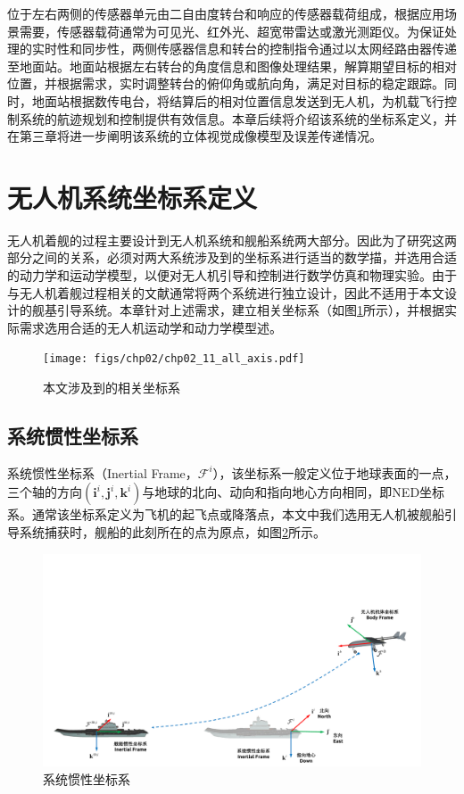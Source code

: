 位于左右两侧的传感器单元由二自由度转台和响应的传感器载荷组成，根据应用场景需要，传感器载荷通常为可见光、红外光、超宽带雷达或激光测距仪。为保证处理的实时性和同步性，两侧传感器信息和转台的控制指令通过以太网经路由器传递至地面站。地面站根据左右转台的角度信息和图像处理结果，解算期望目标的相对位置，并根据需求，实时调整转台的俯仰角或航向角，满足对目标的稳定跟踪。同时，地面站根据数传电台，将结算后的相对位置信息发送到无人机，为机载飞行控制系统的航迹规划和控制提供有效信息。本章后续将介绍该系统的坐标系定义，并在第三章将进一步阐明该系统的立体视觉成像模型及误差传递情况。


\section{无人机系统坐标系定义}
无人机着舰的过程主要设计到无人机系统和舰船系统两大部分。因此为了研究这两部分之间的关系，必须对两大系统涉及到的坐标系进行适当的数学描，并选用合适的动力学和运动学模型，以便对无人机引导和控制进行数学仿真和物理实验。由于与无人机着舰过程相关的文献通常将两个系统进行独立设计，因此不适用于本文设计的舰基引导系统。本章针对上述需求，建立相关坐标系（如图\ref{fig:chp02_11_all_axis}所示），并根据实际需求选用合适的无人机运动学和动力学模型述\cite{beardsmall}。
\begin{figure}[!t]   
	\centering
	\texttt{[image: figs/chp02/chp02\_11\_all\_axis.pdf]}
	\caption{本文涉及到的相关坐标系}
	\label{fig:chp02_11_all_axis}
\end{figure}



\subsection{系统惯性坐标系}
系统惯性坐标系（Inertial Frame，$\mathcal{F}^i$），该坐标系一般定义位于地球表面的一点，三个轴的方向$(\mathbf{i}^i, \mathbf{j}^i,\mathbf{k}^i)$与地球的北向、动向和指向地心方向相同，即NED坐标系。通常该坐标系定义为飞机的起飞点或降落点，本文中我们选用无人机被舰船引导系统捕获时，舰船的此刻所在的点为原点，如图\ref{fig:chp02_01_sys_interial_frame}所示。
\begin{figure}[htb]   
	\centering
	\includegraphics[width=\textwidth]{figs/chp02/chp02_01_sys_interial_frame.pdf}
	\caption{系统惯性坐标系}
	\label{fig:chp02_01_sys_interial_frame}
\end{figure}

